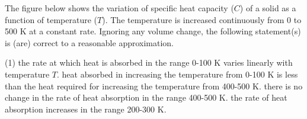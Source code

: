 
\item The figure below shows the variation of specific heat capacity (\(C\)) of a solid as a function of temperature (\(T\)). The temperature is increased continuously from 0 to 500 K at a constant rate. Ignoring any volume change, the following statement(s) is (are) correct to a reasonable approximation.
    \begin{center}
    \end{center}
    \begin{tasks}(1)
        \task the rate at which heat is absorbed in the range 0-100 K varies linearly with temperature \(T\).
        \task heat absorbed in increasing the temperature from 0-100 K is less than the heat required for increasing the temperature from 400-500 K.
        \task there is no change in the rate of heat absorption in the range 400-500 K.
        \task the rate of heat absorption increases in the range 200-300 K.
    \end{tasks}
